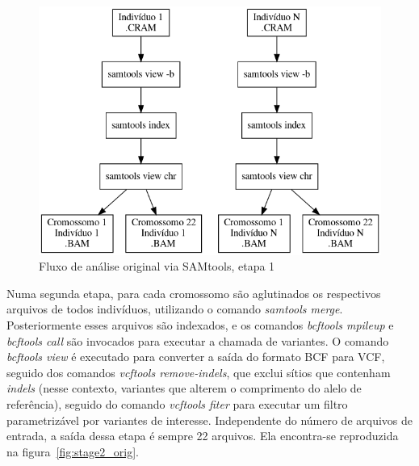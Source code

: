 \documentclass[cic,tc]{iiufrgs}
\begin{document}
\begin{figure}
  \caption{Fluxo de análise original via SAMtools, etapa 1}
    \begin{center}
      \includegraphics[width=0.85\linewidth]{img/stage1_orig.png}
    \end{center}
    \label{fig:stage1_orig}
\end{figure}

Numa segunda etapa, para cada cromossomo são aglutinados os respectivos
arquivos de todos indivíduos, utilizando o comando \textit{samtools merge}.
Posteriormente esses arquivos são indexados, e os comandos \textit{bcftools
mpileup} e \textit{bcftools call} são invocados para executar a chamada de
variantes. O comando \textit{bcftools view} é executado para converter a saída
do formato BCF para VCF, seguido dos comandos \textit{vcftools remove-indels},
que exclui sítios que contenham \textit{indels} (nesse contexto, variantes que
alterem o comprimento do alelo de referência), seguido do comando
\textit{vcftools fiter} para executar um filtro parametrizável por variantes de
interesse. Independente do número de arquivos de entrada, a saída dessa etapa é
sempre 22 arquivos. Ela encontra-se reproduzida na
figura~\ref{fig:stage2_orig}.
\end{document}
